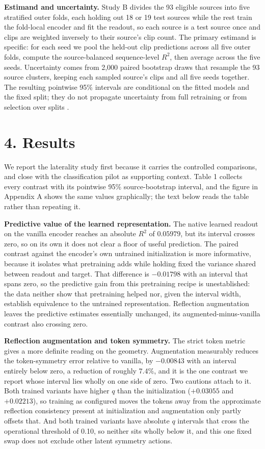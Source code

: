 \documentclass{article}
\begin{document}
\textbf{Estimand and uncertainty.} Study B divides the 93 eligible
sources into five stratified outer folds, each holding out 18 or 19 test
sources while the rest train the fold-local encoder and fit the readout,
so each source is a test source once and clips are weighted inversely to
their source's clip count. The primary estimand is specific: for each
seed we pool the held-out clip predictions across all five outer folds,
compute the source-balanced sequence-level \(R^2\), then average across
the five seeds. Uncertainty comes from 2,000 paired bootstrap draws that
resample the 93 source clusters, keeping each sampled source's clips and
all five seeds together. The resulting pointwise 95\% intervals are
conditional on the fitted models and the fixed split; they do not
propagate uncertainty from full retraining or from selection over splits
\citep{brodersen2010balanced, pedregosa2011scikit}.

\section{4. Results}\label{results}

We report the laterality study first because it carries the controlled
comparisons, and close with the classification pilot as supporting
context. Table 1 collects every contrast with its pointwise 95\%
source-bootstrap interval, and the figure in Appendix A shows the same
values graphically; the text below reads the table rather than repeating
it.

\textbf{Predictive value of the learned representation.} The native
learned readout on the vanilla encoder reaches an absolute \(R^2\) of
\(0.05979\), but its interval crosses zero, so on its own it does not
clear a floor of useful prediction. The paired contrast against the
encoder's own untrained initialization is more informative, because it
isolates what pretraining adds while holding fixed the variance shared
between readout and target. That difference is \(-0.01798\) with an
interval that spans zero, so the predictive gain from this pretraining
recipe is unestablished: the data neither show that pretraining helped
nor, given the interval width, establish equivalence to the untrained
representation. Reflection augmentation leaves the predictive estimates
essentially unchanged, its augmented-minus-vanilla contrast also
crossing zero.

\textbf{Reflection augmentation and token symmetry.} The strict token
metric gives a more definite reading on the geometry. Augmentation
measurably reduces the token-symmetry error relative to vanilla, by
\(-0.00843\) with an interval entirely below zero, a reduction of
roughly 7.4\%, and it is the one contrast we report whose interval lies
wholly on one side of zero. Two cautions attach to it. Both trained
variants have higher \(q\) than the initialization (\(+0.03055\) and
\(+0.02213\)), so training as configured moves the tokens away from the
approximate reflection consistency present at initialization and
augmentation only partly offsets that. And both trained variants have
absolute \(q\) intervals that cross the operational threshold of 0.10,
so neither sits wholly below it, and this one fixed swap does not
exclude other latent symmetry actions.
\end{document}
